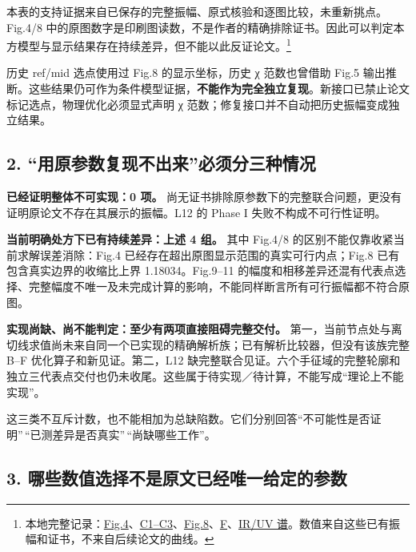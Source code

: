 \documentclass[
  11pt,
  a4paper,
]{article}
\begin{document}
本表的支持证据来自已保存的完整振幅、原式核验和逐图比较，未重新挑点。Fig.4/8
中的原图数字是印刷图读数，不是作者的精确排除证书。因此可以判定本方模型与显示结果存在持续差异，但不能以此反证论文。\footnote{本地完整记录：\href{../mainline_alignment_20260909/B_combined/FIG4_CORE_CLAIMS_ZH.md}{Fig.4}、\href{../mainline_alignment_20260909/C_RESULT_ZH.md}{C1--C3}、\href{../mainline_alignment_20260909/E1_PAPER_RESULT_ZH.md}{Fig.8}、\href{../mainline_alignment_20260909/F_paper/F_RESULT_ZH.md}{F}、\href{../expert_response_20260910/RHO_MECHANISM_AUDIT_ZH.md}{IR/UV
  谱}。数值来自这些已有振幅和证书，不来自后续论文的曲线。}

历史 ref/mid 选点使用过 Fig.8 的显示坐标，历史 χ 范数也曾借助 Fig.5
输出推断。这些结果仍可作为条件模型证据，\textbf{不能作为完全独立复现}。新接口已禁止论文标记选点，物理优化必须显式声明
χ 范数；修复接口并不自动把历史振幅变成独立结果。

\subsection{2.
``用原参数复现不出来''必须分三种情况}\label{ux7528ux539fux53c2ux6570ux590dux73b0ux4e0dux51faux6765ux5fc5ux987bux5206ux4e09ux79cdux60c5ux51b5}

\textbf{已经证明整体不可实现：0 项。}
尚无证书排除原参数下的完整联合问题，更没有证明原论文不存在其展示的振幅。L12
的 Phase I 失败不构成不可行性证明。

\textbf{当前明确处方下已有持续差异：上述 4 组。} 其中 Fig.4/8
的区别不能仅靠收紧当前求解误差消除：Fig.4
已经存在超出原图显示范围的真实可行内点；Fig.8
已有包含真实边界的收缩比上界 1.18034。Fig.9--11
的幅度和相移差异还混有代表点选择、完整幅度不唯一及未完成计算的影响，不能同样断言所有可行振幅都不符合原图。

\textbf{实现尚缺、尚不能判定：至少有两项直接阻碍完整交付。}
第一，当前节点处与离切线求值尚未来自同一个已实现的精确解析族；已有解析比较器，但没有该族完整
B--F 优化算子和新见证。第二，L12
缺完整联合见证。六个手征域的完整轮廓和独立三代表点交付也仍未收尾。这些属于待实现／待计算，不能写成``理论上不能实现''。

这三类不互斥计数，也不能相加为总缺陷数。它们分别回答``不可能性是否证明''\,``已测差异是否真实''\,``尚缺哪些工作''。

\subsection{3.
哪些数值选择不是原文已经唯一给定的参数}\label{ux54eaux4e9bux6570ux503cux9009ux62e9ux4e0dux662fux539fux6587ux5df2ux7ecfux552fux4e00ux7ed9ux5b9aux7684ux53c2ux6570}
\end{document}
